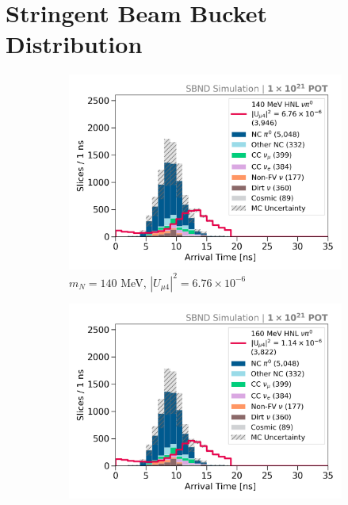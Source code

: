 
\chapter{Stringent Beam Bucket Distribution} 
\label{appendix_stringent}
\ifpdf
    \graphicspath{{Appendix5/Figs/Raster/}{Appendix5/Figs/PDF/}{Appendix5/Figs/}}
\else
    \graphicspath{{Appendix5/Figs/Vector/}{Appendix5/Figs/}}
\fi

\begin{figure}[hb!]
        \begin{subfigure}[b]{0.495\textwidth}
            \includegraphics[width=\textwidth]{m140}
            \caption{$m_N = 140$ MeV, $|U_{\mu4}|^2 = 6.76 \times 10^{-6}$ }
        \end{subfigure}
        \begin{subfigure}[b]{0.495\textwidth}
            \includegraphics[width=\textwidth]{m160}

\end{subfigure}
\end{figure}
